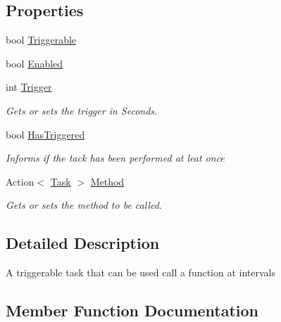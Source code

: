 \subsection*{Properties}
\begin{DoxyCompactItemize}
\item 
bool \hyperlink{class_o_t_a_1_1_misc_1_1_task_a5bd3d3b2d8655be940f15d7d791dcdfb}{Triggerable}
\item 
bool \hyperlink{class_o_t_a_1_1_misc_1_1_task_a43780240f87ab467d37df5ba129dbe21}{Enabled}
\item 
int \hyperlink{class_o_t_a_1_1_misc_1_1_task_ac6e8c4aa02b4e5e43c2f0bd8984b9758}{Trigger}
\begin{DoxyCompactList}\small\item\em Gets or sets the trigger in Seconds. \end{DoxyCompactList}\item 
bool \hyperlink{class_o_t_a_1_1_misc_1_1_task_aba95bd17285d68319df89d3af69c5469}{Has\+Triggered}
\begin{DoxyCompactList}\small\item\em Informs if the tack has been performed at leat once \end{DoxyCompactList}\item 
Action$<$ \hyperlink{class_o_t_a_1_1_misc_1_1_task}{Task} $>$ \hyperlink{class_o_t_a_1_1_misc_1_1_task_a6f959163d25cfc7dc5674615268bb15b}{Method}
\begin{DoxyCompactList}\small\item\em Gets or sets the method to be called. \end{DoxyCompactList}\end{DoxyCompactItemize}


\subsection{Detailed Description}
A triggerable task that can be used call a function at intervals 



\subsection{Member Function Documentation}
\hypertarget{class_o_t_a_1_1_misc_1_1_task_a5c9d95791f3022be8b98ef3fbc25497e}{}
